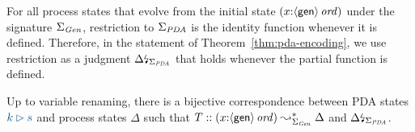 For all process states that evolve from the initial state
$(x{:}{\langle {\sf gen} \rangle}\,{{\it ord}})$ under the signature $\Sigma_{\it
  Gen}$, restriction to $\Sigma_{\it PDA}$ is the identity function
whenever it is defined. Therefore, in the statement of
Theorem~\ref{thm:pda-encoding}, we use restriction as a judgment
${\Delta}{\mbox{\lightning}}_{\Sigma_{\it PDA}}$ that holds whenever the partial 
function is defined.

\bigskip
\begin{theorem}[Encoding]\label{thm:pda-encoding}
  Up to variable renaming, there is a bijective correspondence between
  PDA states $\obj{k \rhd s}$ and process states $\Delta$ such that
  $T :: (x{:}{\langle {\sf gen} \rangle}\,{{\it ord}}) \leadsto^*_{\Sigma_{\it Gen}}
  \Delta$ and ${\Delta}{\mbox{\lightning}}_{\Sigma_{\it
      PDA}}$.
\end{theorem}

